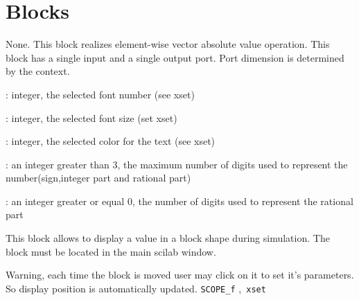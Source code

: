 

\section{Blocks}



%
%


\label{ABSBLKf}

None.
This block realizes element-wise vector absolute value operation. 
This block has a single input and a single output port.
Port dimension is determined by the context.





%
%


\label{AFFICHf}

\begin{scitem}
\item[{\verb?font?}]
: integer, the selected font number (see xset)
\item[{\verb?fontsize?}]
: integer, the selected font size (set xset)
\item[{\verb?color?}]
: integer, the selected color for the text (see xset)
\item[{\verb?Total numer of digits?}]
: an integer greater than 3, the maximum number of digits used to
represent the number(sign,integer part and rational part)
\item[{\verb?rational part numer of digits?}]
: an integer greater or equal 0, the number of digits used to
represent the  rational part

\end{scitem}%
This block allows to display a value in a block shape during
simulation. The block must be located in the main scilab window.

Warning, each time the block is moved user may click on it to set it's
parameters. So display position is automatically updated.
{\verb?SCOPE_f?} \pageref{SCOPEf},{\verb? xset?} \pageref{xset}


